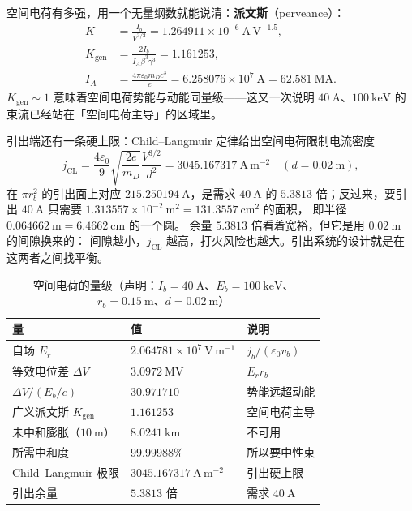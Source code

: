 空间电荷有多强，用一个无量纲数就能说清：\textbf{派文斯}（perveance）：
\begin{equation}
\begin{aligned}
K&=\frac{I_b}{V^{3/2}}=1.264911\times10^{-6}\ \mathrm{A\,V^{-1.5}},\\
K_\mathrm{gen}&=\frac{2I_b}{I_A\beta^3\gamma^3}=1.161253,\\
I_A&=\frac{4\pi\varepsilon_0m_Dc^3}{e}=6.258076\times10^{7}\ \mathrm{A}=62.581\ \mathrm{MA}.
\end{aligned}
\label{eq:app-ax-perv}
\end{equation}
$K_\mathrm{gen}\sim1$ 意味着空间电荷势能与动能同量级——这又一次说明
$40\ \mathrm{A}$、$100\ \mathrm{keV}$ 的束流已经站在「空间电荷主导」的区域里。

引出端还有一条硬上限：Child--Langmuir 定律给出空间电荷限制电流密度
\begin{equation}
j_\mathrm{CL}=\frac{4\varepsilon_0}{9}\sqrt{\frac{2e}{m_D}}\frac{V^{3/2}}{d^2}
=3045.167317\ \mathrm{A\,m^{-2}}\quad(d=0.02\ \mathrm{m}),
\label{eq:app-ax-cl}
\end{equation}
在 $\pi r_b^2$ 的引出面上对应 $215.250194\ \mathrm{A}$，是需求 $40\ \mathrm{A}$ 的
$5.3813$ 倍；反过来，要引出 $40\ \mathrm{A}$ 只需要
$1.313557\times10^{-2}\ \mathrm{m^2}=131.3557\ \mathrm{cm^2}$ 的面积，
即半径 $0.064662\ \mathrm{m}=6.4662\ \mathrm{cm}$ 的一个圆。
余量 $5.3813$ 倍看着宽裕，但它是用 $0.02\ \mathrm{m}$ 的间隙换来的：
间隙越小，$j_\mathrm{CL}$ 越高，打火风险也越大。引出系统的设计就是在这两者之间找平衡。

\begin{table}[htbp]
\centering
\small
\caption{空间电荷的量级（声明：$I_b=40\ \mathrm{A}$、$E_b=100\ \mathrm{keV}$、$r_b=0.15\ \mathrm{m}$、$d=0.02\ \mathrm{m}$）}
\label{tab:app-ax-spacecharge}
\begin{tabular}{p{5.0cm}p{4.6cm}p{3.8cm}}
\hline
量 & 值 & 说明 \\
\hline
自场 $E_r$ & $2.064781\times10^{7}\ \mathrm{V\,m^{-1}}$ & $j_b/(\varepsilon_0v_b)$ \\
等效电位差 $\Delta V$ & $3.0972\ \mathrm{MV}$ & $E_rr_b$ \\
$\Delta V/(E_b/e)$ & $30.971710$ & 势能远超动能 \\
广义派文斯 $K_\mathrm{gen}$ & $1.161253$ & 空间电荷主导 \\
未中和膨胀（$10\ \mathrm{m}$） & $8.0241\ \mathrm{km}$ & 不可用 \\
所需中和度 & $99.99988\%$ & 所以要中性束 \\
Child--Langmuir 极限 & $3045.167317\ \mathrm{A\,m^{-2}}$ & 引出硬上限 \\
引出余量 & $5.3813$ 倍 & 需求 $40\ \mathrm{A}$ \\
\hline
\end{tabular}
\end{table}

